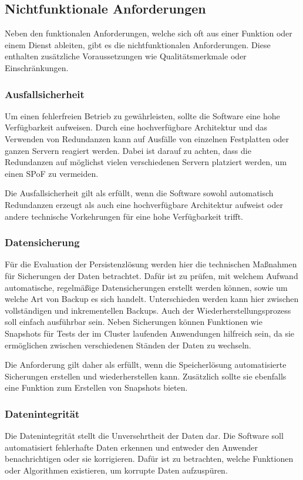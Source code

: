 \subsection{Nichtfunktionale Anforderungen} %
\label{sec:nichtfunktionale}
Neben den funktionalen Anforderungen, welche sich oft aus einer Funktion oder einem Dienst ableiten, gibt es die nichtfunktionalen Anforderungen. Diese enthalten zusätzliche Voraussetzungen wie Qualitätsmerkmale oder Einschränkungen.

\subsubsection{Ausfallsicherheit}
Um einen fehlerfreien Betrieb zu gewährleisten, sollte die Software eine hohe Verfügbarkeit aufweisen. Durch eine hochverfügbare Architektur und das Verwenden von Redundanzen kann auf Ausfälle von einzelnen Festplatten oder ganzen Servern reagiert werden. Dabei ist darauf zu achten, dass die Redundanzen auf möglichst vielen verschiedenen Servern platziert werden, um einen \ac{SPoF} zu vermeiden. \medskip

Die Ausfallsicherheit gilt als erfüllt, wenn die Software sowohl automatisch Redundanzen erzeugt als auch eine hochverfügbare Architektur aufweist oder andere technische Vorkehrungen für eine hohe Verfügbarkeit trifft. 

\subsubsection{Datensicherung}
Für die Evaluation der Persistenzlösung werden hier die technischen Maßnahmen für Sicherungen der Daten betrachtet. Dafür ist zu prüfen, mit welchem Aufwand automatische, regelmäßige Datensicherungen erstellt werden können, sowie um welche Art von Backup es sich handelt. Unterschieden werden kann hier zwischen vollständigen und inkrementellen Backups. Auch der Wiederherstellungsprozess soll einfach ausführbar sein. Neben Sicherungen können Funktionen wie Snapshots für Tests der im Cluster laufenden Anwendungen hilfreich sein, da sie ermöglichen zwischen verschiedenen Ständen der Daten zu wechseln.  \medskip

Die Anforderung gilt daher als erfüllt, wenn die Speicherlösung automatisierte Sicherungen erstellen und wiederherstellen kann. Zusätzlich sollte sie ebenfalls eine Funktion zum Erstellen von Snapshots bieten.

\subsubsection{Datenintegrität}
Die Datenintegrität stellt die Unversehrtheit der Daten dar. Die Software soll automatisiert fehlerhafte Daten erkennen und entweder den Anwender benachrichtigen oder sie korrigieren. Dafür ist zu betrachten, welche Funktionen oder Algorithmen existieren, um korrupte Daten aufzuspüren.

